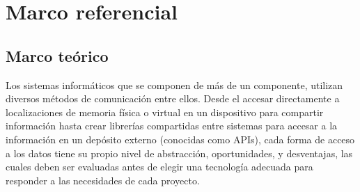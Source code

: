 \section{Marco referencial}

\subsection{Marco teórico}












Los sistemas informáticos que se componen de más de un componente, utilizan diversos métodos de comunicación entre ellos. Desde el accesar directamente a localizaciones de memoria física o virtual en un dispositivo para compartir información hasta crear librerías compartidas entre sistemas para accesar a la información en un depósito externo (conocidas como APIs), cada forma de acceso a los datos tiene su propio nivel de abstracción, oportunidades, y desventajas, las cuales deben ser evaluadas antes de elegir una tecnología adecuada para responder a las necesidades de cada proyecto.

